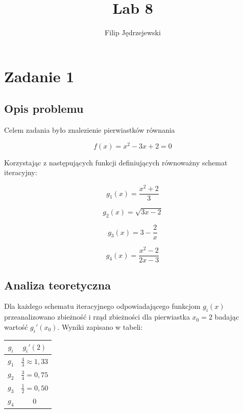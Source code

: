 \documentclass{article}
\title{Lab 8}
\author{Filip Jędrzejewski}
\begin{document}
	\maketitle
	
	\section*{Zadanie 1}
	
	\subsection*{Opis problemu}

	Celem zadania było znalezienie pierwiastków równania 

	\begin{equation}
		f(x) = x^2 -3x +2  = 0
	\end{equation}

	Korzystając z następujących funkcji definiujących równoważny schemat iteracyjny:

	\begin{equation}
		g_1(x) =  \frac{x^2+2}{3}
	\end{equation}

	\begin{equation}
		g_2(x) =  \sqrt{3x - 2}
	\end{equation}

	\begin{equation}
		g_3(x) =  3 - \frac{2}{x}
	\end{equation}

	\begin{equation}
		g_4(x) =  \frac{x^2-2}{2x-3}
	\end{equation}



	\subsection*{Analiza teoretyczna}

	Dla każdego schematu iteracyjnego odpowiadającego funkcjom $g_i(x)$ przeanalizowano zbieżność i rząd zbieżności dla pierwiastka $x_0 = 2$ badając wartość $g_i'(x_0)$. Wyniki zapisano w tabeli:

	\begin{center}
		\begin{tabular}{c|c}
  			\hline 
  			$g_i$ & $g_i'(2)$\\
  			\hline
  			$g_1$ & $\frac{4}{3} \approx 1,33$ \\
  			$g_2$ & $\frac{3}{4} = 0,75$ \\
  			$g_3$ & $\frac{1}{2} = 0,50$ \\
  			$g_4$ & $0$ \\
		\end{tabular} 
		
	\end{center}	
\end{document}
